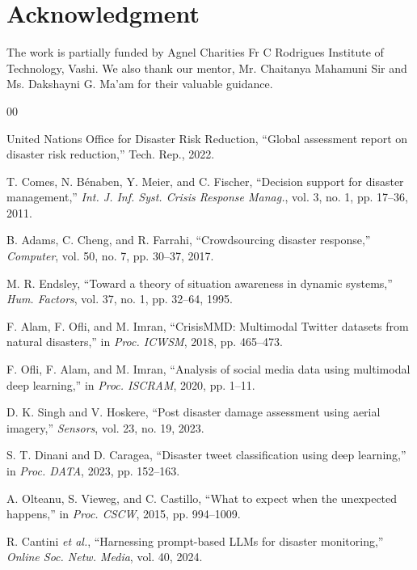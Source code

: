 \documentclass[conference]{IEEEtran}
\begin{document}
\section*{Acknowledgment}
The work is partially funded by Agnel Charities Fr C Rodrigues Institute of Technology, Vashi. We also thank our mentor, Mr. Chaitanya Mahamuni Sir and Ms. Dakshayni G. Ma'am for their valuable guidance.

\begin{thebibliography}{00}

 United Nations Office for Disaster Risk Reduction, ``Global assessment report on disaster risk reduction,'' Tech. Rep., 2022.

 T. Comes, N. B\'{e}naben, Y. Meier, and C. Fischer, ``Decision support for disaster management,'' \textit{Int. J. Inf. Syst. Crisis Response Manag.}, vol. 3, no. 1, pp. 17--36, 2011.

 B. Adams, C. Cheng, and R. Farrahi, ``Crowdsourcing disaster response,'' \textit{Computer}, vol. 50, no. 7, pp. 30--37, 2017.

 M. R. Endsley, ``Toward a theory of situation awareness in dynamic systems,'' \textit{Hum. Factors}, vol. 37, no. 1, pp. 32--64, 1995.

 F. Alam, F. Ofli, and M. Imran, ``CrisisMMD: Multimodal Twitter datasets from natural disasters,'' in \textit{Proc. ICWSM}, 2018, pp. 465--473.

 F. Ofli, F. Alam, and M. Imran, ``Analysis of social media data using multimodal deep learning,'' in \textit{Proc. ISCRAM}, 2020, pp. 1--11.

 D. K. Singh and V. Hoskere, ``Post disaster damage assessment using aerial imagery,'' \textit{Sensors}, vol. 23, no. 19, 2023.

 S. T. Dinani and D. Caragea, ``Disaster tweet classification using deep learning,'' in \textit{Proc. DATA}, 2023, pp. 152--163.

 A. Olteanu, S. Vieweg, and C. Castillo, ``What to expect when the unexpected happens,'' in \textit{Proc. CSCW}, 2015, pp. 994--1009.

 R. Cantini \textit{et al.}, ``Harnessing prompt-based LLMs for disaster monitoring,'' \textit{Online Soc. Netw. Media}, vol. 40, 2024.


\end{thebibliography}
\end{document}
